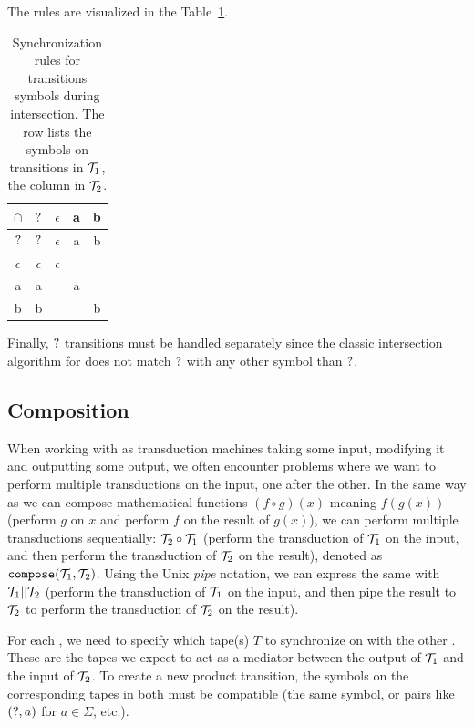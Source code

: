 The rules are visualized in the Table~\ref{tab:synchronization_rules}.
\begin{table}[ht]
\centering
\begin{tabular}{ |c||c|c|c|c| }
 \hline
 $\cap$ & $?$ & $\epsilon$ & a & b \\
 \hline
 \hline
 $?$ & $?$ & $\epsilon$ & a & b \\
 \hline
 $\epsilon$ & $\epsilon$ & $\epsilon$ & & \\
 \hline
 a & a &  & a &\\
 \hline
 b & b &  & & b\\
 \hline
\end{tabular}
\caption{
  Synchronization rules for transitions symbols during intersection.
  The row lists the symbols on transitions in $\mathcal{T}_1$, the column in $\mathcal{T}_2$.
}
\label{tab:synchronization_rules}
\end{table}

Finally, $?$ transitions must be handled separately since the classic intersection algorithm for \nfas does not match $?$ with any other symbol than $?$.

\subsection{Composition}

When working with \nfts as transduction machines taking some input, modifying it and outputting some output, we often encounter problems where we want to perform multiple transductions on the input, one after the other.
In the same way as we can compose mathematical functions $(f \circ g)(x)$ meaning $f(g(x))$ (perform $g$ on $x$ and perform $f$ on the result of $g(x)$),
we can perform multiple \nft transductions sequentially: $\mathcal{T}_2 \circ \mathcal{T}_1$
(perform the transduction of $\mathcal{T}_1$ on the input, and then perform the transduction of $\mathcal{T}_2$ on the result), denoted as $\texttt{compose}(\mathcal{T}_1, \mathcal{T}_2)$.
Using the Unix \emph{pipe} notation, we can express the same with $\mathcal{T}_1 || \mathcal{T}_2$
(perform the transduction of $\mathcal{T}_1$ on the input, and then pipe the result to $\mathcal{T}_2$ to perform the transduction of $\mathcal{T}_2$ on the result).

For each \nft, we need to specify which tape(s) $T$ to synchronize on with the other \nft.
These are the tapes we expect to act as a mediator between the output of $\mathcal{T}_1$ and the input of $\mathcal{T}_2$.
To create a new product transition, the symbols on the corresponding tapes in both \nfts must be compatible (the same symbol, or pairs like $(?, a)$ for $a \in \Sigma$, etc.).

